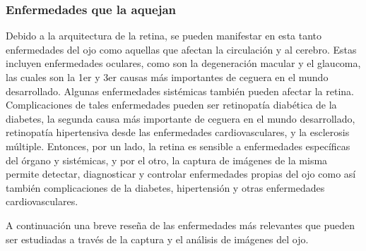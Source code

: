 			\subsubsection{Enfermedades que la aquejan}
			
Debido a la arquitectura de la retina, se pueden manifestar en esta tanto enfermedades del ojo como aquellas que afectan la circulación y al cerebro. Estas incluyen enfermedades oculares, como son la degeneración macular y el glaucoma, las cuales son la 1er y 3er causas más importantes de ceguera en el mundo desarrollado. Algunas enfermedades sistémicas también pueden afectar la retina. Complicaciones de tales enfermedades pueden ser retinopatía diabética de la diabetes, la segunda causa más importante de ceguera en el mundo desarrollado, retinopatía hipertensiva desde las enfermedades cardiovasculares, y la esclerosis múltiple. Entonces, por un lado, la retina es sensible a enfermedades específicas del órgano y sistémicas, y por el otro, la captura de imágenes de la misma permite detectar, diagnosticar y controlar enfermedades propias del ojo como así también complicaciones de la diabetes, hipertensión y otras enfermedades cardiovasculares.
			



A continuación una breve reseña de las enfermedades más relevantes que pueden ser estudiadas a través de la captura y el análisis de imágenes del ojo.

